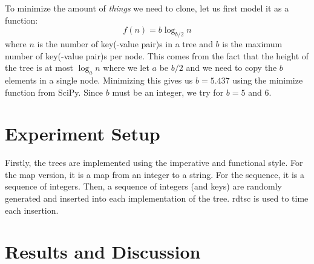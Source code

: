 \documentclass{article}
\begin{document}
To minimize the amount of \textit{things} we need to clone, let us first model it as a function:
$$ f(n) = b\log_{b/2}n $$
where $n$ is the number of key(-value pair)s in a tree and $b$ is the maximum number of
key(-value pair)s per node. This comes from the fact that the height of the tree is at most
$\log_{a}n$ where we let $a$ be $b/2$ and we need to copy the $b$ elements in a single node.
Minimizing this gives us $b = 5.437$ using the minimize function
from SciPy. Since $b$ must be an integer, we try for $b = 5$ and $6$.

\section{Experiment Setup}

Firstly, the trees are implemented using the imperative and functional style. For the map
version, it is a map from an integer to a string. For the sequence, it is a sequence of
integers. Then, a sequence of integers (and keys) are randomly generated and inserted into
each implementation of the tree. rdtsc is used to time each insertion.

\section{Results and Discussion}
\end{document}
